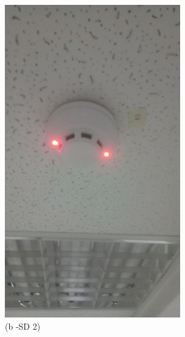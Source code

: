 \begin{figure}
\begin{minipage}[b]{0.2\linewidth}
				\includegraphics[width=\textwidth]{figures/R1P_fdas/SD2.jpg}
		\caption*{(b -SD 2)}
	\end{minipage}
	\hspace{0.05cm}
	\begin{minipage}[b]{0.2\linewidth}
		\centering

\end{minipage}
\end{figure}
